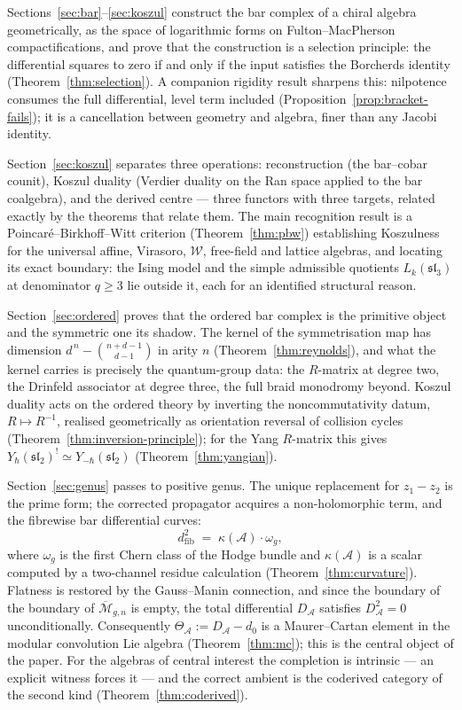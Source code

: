 \documentclass[11pt]{amsart}
\numberwithin{equation}{section}
\theoremstyle{plain}
\theoremstyle{definition}
\theoremstyle{remark}
\newcommand{\cA}{\mathcal{A}}
\newcommand{\cM}{\mathcal{M}}
\newcommand{\cW}{\mathcal{W}}
\newcommand{\Dfib}{d_{\mathrm{fib}}}
\newcommand{\Mbar}{\overline{\cM}}
\begin{document}
Sections~\ref{sec:bar}--\ref{sec:koszul} construct the bar complex of a chiral
algebra geometrically, as the space of logarithmic forms on Fulton--MacPherson
compactifications, and prove that the construction is a selection principle:
the differential squares to zero if and only if the input satisfies the
Borcherds identity (Theorem~\ref{thm:selection}). A companion rigidity
result sharpens this: nilpotence consumes the full differential, level
term included (Proposition~\ref{prop:bracket-fails}); it is a
cancellation between geometry and algebra, finer than any Jacobi
identity.

Section~\ref{sec:koszul} separates three operations: reconstruction
(the bar--cobar counit), Koszul duality (Verdier duality on the Ran
space applied to the bar coalgebra), and the derived centre --- three
functors with three targets, related exactly by the theorems that
relate them. The main recognition result is a
Poincar\'e--Birkhoff--Witt criterion (Theorem~\ref{thm:pbw})
establishing Koszulness for the universal affine, Virasoro, $\cW$,
free-field and lattice algebras, and locating its exact boundary:
the Ising model and the simple admissible quotients
$L_k(\mathfrak{sl}_3)$ at denominator $q\geq 3$ lie outside it, each
for an identified structural reason.

Section~\ref{sec:ordered} proves that the ordered bar complex is the primitive
object and the symmetric one its shadow. The kernel of the symmetrisation map
has dimension $d^{\,n}-\binom{n+d-1}{d-1}$ in arity $n$
(Theorem~\ref{thm:reynolds}), and what the kernel carries is precisely the
quantum-group data: the $R$-matrix at degree two, the Drinfeld associator at
degree three, the full braid monodromy beyond. Koszul duality acts on the
ordered theory by inverting the noncommutativity datum, $R\mapsto R^{-1}$,
realised geometrically as orientation reversal of collision cycles
(Theorem~\ref{thm:inversion-principle}); for the Yang $R$-matrix this gives
$Y_{\hbar}(\mathfrak{sl}_2)^{!}\simeq Y_{-\hbar}(\mathfrak{sl}_2)$
(Theorem~\ref{thm:yangian}).

Section~\ref{sec:genus} passes to positive genus. The unique replacement for
$z_1-z_2$ is the prime form; the corrected propagator acquires a
non-holomorphic term, and the fibrewise bar differential curves:
\begin{equation}\label{eq:curvature-intro}
\Dfib^{2}\;=\;\kappa(\cA)\cdot\omega_g,
\end{equation}
where $\omega_g$ is the first Chern class of the Hodge bundle and
$\kappa(\cA)$ is a scalar computed by a two-channel residue calculation
(Theorem~\ref{thm:curvature}). Flatness is restored by the Gauss--Manin
connection, and since the boundary of the boundary of $\Mbar_{g,n}$ is empty,
the total differential $D_{\cA}$ satisfies $D_{\cA}^{2}=0$ unconditionally. Consequently $\Theta_{\cA}:=D_{\cA}-d_0$ is a Maurer--Cartan element
in the modular convolution Lie algebra (Theorem~\ref{thm:mc}); this is the
central object of the paper. For the algebras of central
interest the completion is intrinsic --- an explicit witness forces it
--- and the correct ambient is the coderived category of the second
kind (Theorem~\ref{thm:coderived}).
\end{document}
